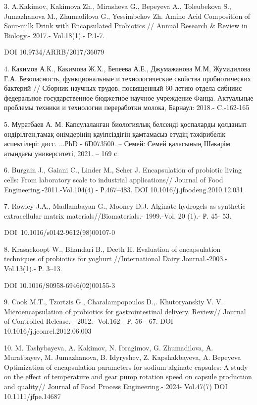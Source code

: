 3. A.Kakimov, Kakimova Zh., Mirasheva G., Bepeyeva A., Toleubekova S.,
Jumazhanova M., Zhumadilova G., Yessimbekov Zh. Amino Acid Composition
of Sour-milk Drink with Encapsulated Probiotics // Annual Research \&
Review in Biology.- 2017.- Vol.18(1).- P.1-7.

DOI 10.9734/ARRB/2017/36079

4. Какимов А.К., Какимова Ж.Х., Бепеева А.Е., Джумажанова М.М,
Жумадилова Г.А. Безопасность, функциональные и технологические свойства
пробиотических бактерий // Сборник научных трудов, посвященный 60-летию
отдела сибниис федеральное государственное бюджетное научное учреждение
Фанца. Актуальные проблемы техники и технологии переработки молока,
Барнаул: 2018.- C.-162-165

5. Муратбаев А. М. Капсулаланған биологиялық белсенді қоспаларды
қолданып өндірілген,тамақ өнімдерінің қауіпсіздігін қамтамасыз етудің
тәжірибелік аспектілері: дисс. ...РhD - 6D073500. -- Семей: Семей
қаласының Шәкәрім атындағы университеті, 2021. -- 169 с.

6. Burgain J., Gaiani C., Linder M., Scher J. Encapsulation of probiotic
living cells: From laboratory scale to industrial applications// Journal
of Food Engineering.-2011.-Vol.104(4) - Р.467--483. DOI
10.1016/j.jfoodeng.2010.12.031

7. Rowley J.A., Madlambayan G., Mooney D.J. Alginate hydrogels as
synthetic extracellular matrix materials//Biomaterials.- 1999.-Vol. 20
(1).- Р. 45- 53.

DOI~10.1016/s0142-9612(98)00107-0

8. Krasaekoopt W., Bhandari B., Deeth H. Evaluation of encapsulation
techniques of probiotics for yoghurt //International Dairy
Journal.-2003.- Vol.13(1).- Р. 3--13.

DOI 10.1016/S0958-6946(02)00155-3

9. Cook M.T., Tzortzis G., Charalampopoulos D.,. Khutoryanskiy V. V.
Microencapsulation of probiotics for gastrointestinal delivery. Review//
Journal of Controlled Release. - 2012.- Vol.162 - Р. 56 - 67. DOI
10.1016/j.jconrel.2012.06.003

10. M. Tashybayeva, A. Kakimov, N. Ibragimov, G. Zhumadilova, А.
Muratbayev, M. Jumazhanova, B. Idyryshev, Z. Kapshakbayeva, A. Bepeyeva
Optimization of encapsulation parameters for sodium alginate capsules: A
study on the effect of temperature and gear pump rotation speed on
capsule production and quality// Journal of Food Process Engineering.-
2024- Vol.47(7) DOI 10.1111/jfpe.14687

